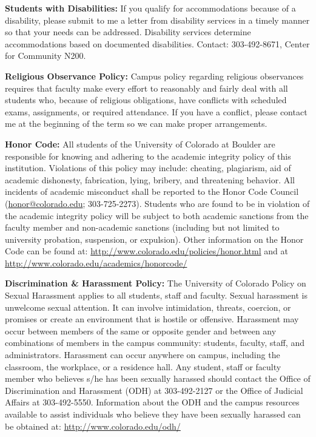 \documentclass[11pt]{article}
\begin{document}
\footnotesize{
	\vspace{5mm}\noindent 
	\textbf{Students with Disabilities:} 
	If you qualify for accommodations because of a disability, please submit to me a letter from disability services in a timely manner so that your needs can be addressed. Disability services determine accommodations based on documented disabilities.
	Contact: 303-492-8671, Center for Community N200.
	
	\vspace{5mm}\noindent
	\textbf{Religious Observance Policy:}
	Campus policy regarding religious observances requires that faculty make every effort to reasonably and fairly deal with all students who, because of religious obligations, have conflicts with scheduled exams, assignments, or required attendance. If you have a conflict, please contact me at the beginning of the term so we can make proper arrangements. 
	
	\vspace{5mm}\noindent
	\textbf{Honor Code:}
	All students of the University of Colorado at Boulder are responsible for knowing and adhering to the academic integrity policy of this institution. Violations of this policy may include: cheating, plagiarism, aid of academic dishonesty, fabrication, lying, bribery, and threatening behavior. All incidents of academic misconduct shall be reported to the Honor Code Council (\href{mailto:honor@colorado.edu}{honor@colorado.edu}; 303-725-2273).
	Students who are found to be in violation of the academic integrity policy will be subject to both academic sanctions from the faculty member and non-academic sanctions (including but not limited to university probation, suspension, or expulsion). Other information on the Honor Code can be found at: \url{http://www.colorado.edu/policies/honor.html} and at \url{http://www.colorado.edu/academics/honorcode/}
	
	\vspace{5mm}\noindent
	\textbf{Discrimination \& Harassment Policy:}
	The University of Colorado Policy on Sexual Harassment applies to all students, staff and faculty. Sexual harassment is unwelcome sexual attention. It can involve intimidation, threats, coercion, or promises or create an environment that is hostile or offensive. Harassment may occur between members of the same or opposite gender and between any combinations of members in the campus community: students, faculty, staff, and administrators. Harassment can occur anywhere on campus, including the classroom, the workplace, or a residence hall. Any student, staff or faculty member who believes s/he has been sexually harassed should contact the Office of Discrimination and Harassment (ODH) at 303-492-2127 or the Office of Judicial Affairs at 303-492-5550. Information about the ODH and the campus resources available to assist individuals who believe they have been sexually harassed can be obtained at: \url{http://www.colorado.edu/odh/}

}
\end{document}
